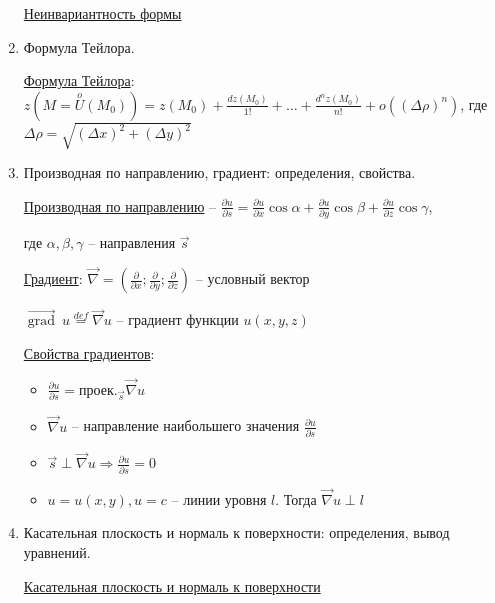 \documentclass[12pt]{article}
\begin{document}
\begin{enumerate}
        \hyperlink{noninvariantofseconddifferentialoffunctionoftwovariables}{Неинвариантность формы}

        \item Формула Тейлора.

        \hyperlink{formulataylor}{Формула Тейлора}: $\displaystyle z(M = \stackrel{o}{U}(M_0)) = z(M_0) + \frac{dz(M_0)}{1!} + \dots + \frac{d^n z(M_0)}{n!} + o((\Delta \rho)^n)$,
        где $\Delta \rho = \sqrt{(\Delta x)^2 + (\Delta y)^2}$

        \item Производная по направлению, градиент: определения, свойства.

        \hyperlink{derivativeoffunctionindirection}{Производная по направлению} -- $\frac{\partial u}{\partial s} = \frac{\partial u}{\partial x} \cos\alpha + \frac{\partial u}{\partial y} \cos\beta + \frac{\partial u}{\partial z} \cos\gamma$,

        где $\alpha, \beta, \gamma$ -- направления $\vec{s}$

        \hyperlink{gradientdefinition}{Градиент}: $\vec\nabla = \left(\frac{\partial}{\partial x}; \frac{\partial}{\partial y}; \frac{\partial}{\partial z}\right)$ -- условный вектор

        $\overrightarrow{\operatorname{grad}} \ u \stackrel{def}{=} \vec\nabla u$ -- градиент функции $u(x, y, z)$

        \hyperlink{gradientproperties}{Свойства градиентов}:

        \begin{itemize}
            \item $\frac{\partial u}{\partial s} = \text{проек.}_{\vec{s}} \vec\nabla u$

            \item $\vec\nabla u$ -- направление наибольшего значения $\frac{\partial u}{\partial s}$

            \item $\vec{s} \perp \vec\nabla u \Longrightarrow \frac{\partial u}{\partial s} = 0$

            \item $u = u(x, y), u = c$ -- линии уровня $l$. Тогда $\vec\nabla u \perp l$
        \end{itemize}


        \item Касательная плоскость и нормаль к поверхности: определения, вывод уравнений.

        \hyperlink{tangentandnormaltosurface}{Касательная плоскость и нормаль к поверхности}


\end{enumerate}
\end{document}
